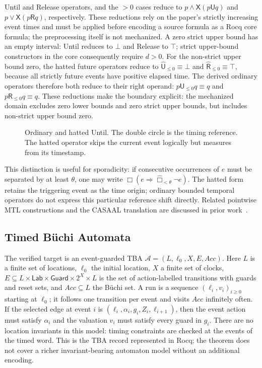 \documentclass{ieeeaccess}
\newcommand{\Until}{\mathbin{\mathsf{U}}}
\newcommand{\Release}{\mathbin{\mathsf{R}}}
\newcommand{\hUntil}{\mathbin{\widehat{\mathsf{U}}}}
\newcommand{\hRelease}{\mathbin{\widehat{\mathsf{R}}}}
\newcommand{\Next}{\mathsf{X}}
\begin{document}
Until and Release operators, and the $>0$ cases reduce to
$p\land\Next(p\Until q)$ and $p\lor\Next(p\Release q)$,
respectively. These reductions rely on the paper's strictly increasing event
times and must be applied before encoding a source formula as a Rocq core
formula; the preprocessing itself is not mechanized. A zero strict
upper bound has an empty interval: Until reduces to $\bot$ and Release to
$\top$; strict upper-bound constructors in the core consequently require
$d>0$. For the non-strict upper bound zero, the hatted future operators reduce
to $\hUntil_{\le0}\equiv\bot$ and $\hRelease_{\le0}\equiv\top$, because all
strictly future events have positive elapsed time. The derived ordinary
operators therefore both reduce to their right operand:
$p\Until_{\le0}q\equiv q$ and $p\Release_{\le0}q\equiv q$. These reductions
make the boundary explicit: the mechanized domain excludes zero lower bounds
and zero strict upper bounds, but includes non-strict upper bound zero.

\begin{figure}[t]
\centering

\caption{Ordinary and hatted Until. The double circle is the timing reference.
The hatted operator skips the current event logically but measures from its
timestamp.}
\label{fig:hatted-until}
\end{figure}

This distinction is useful for sporadicity: if consecutive occurrences of
$e$ must be separated by at least $\theta$, one may write
$\Box(e\Rightarrow\widehat{\Box}_{<\theta}\neg e)$. The hatted form retains
the triggering event as the time origin; ordinary bounded temporal
operators do not express this particular reference shift directly.
Related pointwise MTL constructions and the CASAAL translation are discussed
in prior work~\cite{ouaknine_worrell_lics05,bouyer_chevalier_markey_fsttcs05,li_spin7,casaal_tool}.

\subsection{Timed B\"uchi Automata}
\label{sec:tba}
The verified target is an event-guarded TBA
$\mathcal A=(L,\ell_0,X,E,\mathit{Acc})$. Here $L$ is a finite set of
locations, $\ell_0$ the initial location, $X$ a finite set of clocks,
$E\subseteq L\times\mathsf{Lab}\times\mathsf{Guard}\times 2^X\times L$
is the set of action-labelled transitions with guards and reset sets, and
$\mathit{Acc}\subseteq L$ the B\"uchi set. A run is a sequence
$(\ell_i,v_i)_{i\ge0}$ starting at $\ell_0$; it follows one transition per
event and visits $\mathit{Acc}$ infinitely often. If the selected edge at
event $i$ is $(\ell_i,\alpha_i,g_i,Z_i,\ell_{i+1})$, then the event action
must satisfy $\alpha_i$ and the valuation $v_i$ must satisfy every guard in
$g_i$. There are no location invariants in this model: timing constraints
are checked at the events of the timed word. This is the TBA record
represented in Rocq; the theorem does not cover a richer invariant-bearing
automaton model without an additional encoding.
\end{document}
